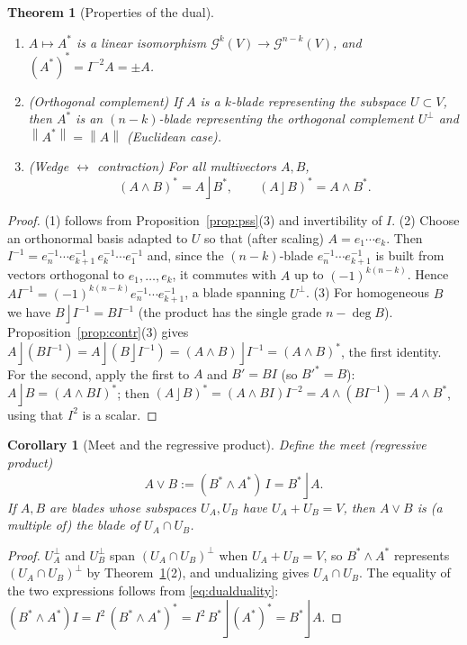 \documentclass[11pt,a4paper]{article}
\newcounter{thm}[section]
\numberwithin{equation}{section}
\theoremstyle{definition}
\theoremstyle{plain}
\newtheorem{theorem}[thm]{Theorem}
\newtheorem{corollary}[thm]{Corollary}
\newcommand{\GA}{\mathcal{G}}
\newcommand{\lc}{\mathbin{\rfloor}}
\newcommand{\pss}{I}
\newcommand{\dual}[1]{#1^{\ast}}
\newcommand{\meet}{\vee}
\newcommand{\norm}[1]{\left\lVert #1\right\rVert}
\begin{document}
\begin{theorem}[Properties of the dual]\label{thm:dual}
\begin{enumerate}
  \item $A\mapsto\dual A$ is a linear isomorphism $\GA^k(V)\to\GA^{n-k}(V)$, and $\dual{(\dual A)}=\pss^{-2}A=\pm A$.
  \item (\emph{Orthogonal complement}) If $A$ is a $k$-blade representing the subspace $U\subset V$, then $\dual A$ is an $(n-k)$-blade representing the orthogonal complement $U^\perp$ and $\norm{\dual A}=\norm A$ (Euclidean case).
  \item (\emph{Wedge $\leftrightarrow$ contraction}) For all multivectors $A,B$,
  \begin{equation}\label{eq:dualduality}
   \dual{(A\wedge B)}=A\lc\dual B,\qquad \dual{(A\lc B)}=A\wedge\dual B .
  \end{equation}
\end{enumerate}
\end{theorem}
\begin{proof}
(1) follows from Proposition~\ref{prop:pss}(3) and invertibility of $\pss$.
(2) Choose an orthonormal basis adapted to $U$ so that (after scaling) $A=e_1\cdots e_k$. Then $\pss^{-1}=e_n^{-1}\cdots e_{k+1}^{-1}\,e_k^{-1}\cdots e_1^{-1}$ and, since the $(n-k)$-blade $e_n^{-1}\cdots e_{k+1}^{-1}$ is built from vectors orthogonal to $e_1,\dots,e_k$, it commutes with $A$ up to $(-1)^{k(n-k)}$. Hence $A\pss^{-1}=(-1)^{k(n-k)}e_n^{-1}\cdots e_{k+1}^{-1}$, a blade spanning $U^\perp$.
(3) For homogeneous $B$ we have $B\lc\pss^{-1}=B\pss^{-1}$ (the product has the single grade $n-\deg B$). Proposition~\ref{prop:contr}(3) gives
$A\lc(B\pss^{-1})=A\lc(B\lc\pss^{-1})=(A\wedge B)\lc\pss^{-1}=\dual{(A\wedge B)}$, the first identity. For the second, apply the first to $A$ and $B'=B\pss$ (so $\dual{B'}=B$): $A\lc B=\dual{(A\wedge B\pss)}$; then $\dual{(A\lc B)}=(A\wedge B\pss)\pss^{-2}=A\wedge(B\pss^{-1})=A\wedge\dual B$, using that $\pss^{2}$ is a scalar.
\end{proof}

\begin{corollary}[Meet and the regressive product]\label{cor:meet}
Define the \emph{meet} (regressive product)
\[
 A\meet B:=(\dual B\wedge\dual A)\,\pss=\dual B\lc A .
\]
If $A,B$ are blades whose subspaces $U_A,U_B$ have $U_A+U_B=V$, then $A\meet B$ is (a multiple of) the blade of $U_A\cap U_B$.
\end{corollary}
\begin{proof}
$U_A^\perp$ and $U_B^\perp$ span $(U_A\cap U_B)^\perp$ when $U_A+U_B=V$, so $\dual B\wedge\dual A$ represents $(U_A\cap U_B)^\perp$ by Theorem~\ref{thm:dual}(2), and undualizing gives $U_A\cap U_B$. The equality of the two expressions follows from \eqref{eq:dualduality}: $(\dual B\wedge\dual A)\pss=\pss^2\,\dual{(\dual B\wedge\dual A)}=\pss^2\,\dual B\lc\dual{(\dual A)}=\dual B\lc A$.
\end{proof}
\end{document}
